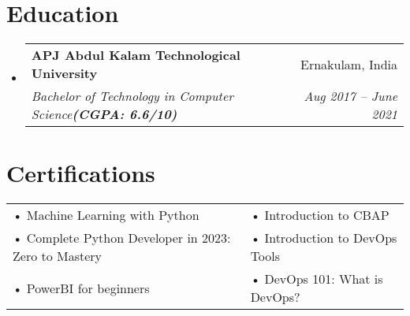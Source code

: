 \documentclass[letterpaper,10pt]{article}
\makeatletter
\newcommand{\resumeItem}[1]{\item\small{#1}}
\newcommand{\resumeSubheading}[4]{
\vspace{-1pt}\item
  \begin{tabular*}{0.97\textwidth}[t]{l@{\extracolsep{\fill}}r}
    \textbf{#1} & #2 \\
    \textit{#3} & \textit{#4} \\
  \end{tabular*}\vspace{-7pt}
}
\newcommand{\resumeSubHeadingList}{\begin{itemize}[leftmargin=0.15in, label={}]}
\newcommand{\resumeSubHeadingListEnd}{\end{itemize}}
\makeatother
\begin{document}
\section{Education}
\resumeSubHeadingList
\resumeSubheading
{APJ Abdul Kalam Technological University}{Ernakulam, India}
{Bachelor of Technology in Computer Science\textbf{(CGPA: 6.6/10)}}{Aug 2017 -- June 2021}
\resumeSubHeadingListEnd


\section{Certifications}
\begin{tabular}{p{10cm}p{10cm}}
  • Machine Learning with Python                       & • Introduction to CBAP         \\
  • Complete Python Developer in 2023: Zero to Mastery & • Introduction to DevOps Tools \\
  • PowerBI for beginners                              & • DevOps 101: What is DevOps?  \\
\end{tabular}
\end{document}
